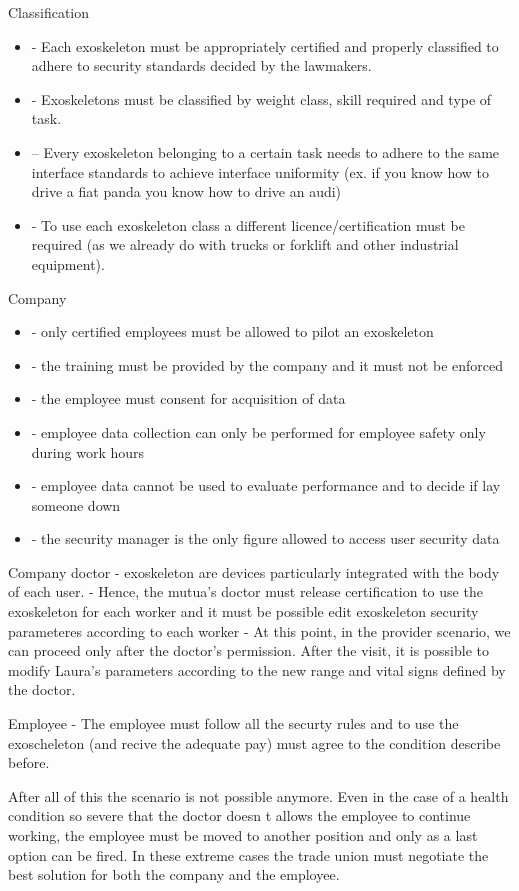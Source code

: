 \documentclass{article}
\begin{document}
Classification
\begin{itemize}
    \item - Each exoskeleton must be appropriately certified and properly classified to adhere to security standards decided by the lawmakers.
    \item - Exoskeletons must be classified by weight class, skill required and type of task.
    \item -- Every exoskeleton belonging to a certain task needs to adhere to the same interface standards to achieve interface uniformity (ex. if you know how to drive a fiat panda you know how to drive an audi)
    \item - To use each exoskeleton class a different licence/certification must be required (as we already do with trucks or forklift and other industrial equipment).
\end{itemize}


Company 
\begin{itemize}
    \item - only certified employees must be allowed to pilot an exoskeleton
    \item - the training must be provided by the company and it must not be enforced
    \item - the employee must consent for acquisition of data
    \item - employee data collection can only be performed for employee safety only during work hours
    \item - employee data cannot be used to evaluate performance and to decide if lay someone down
    \item - the security manager is the only figure allowed to access user security data
\end{itemize}
Company doctor
- exoskeleton are devices particularly integrated with the body of each user. 
- Hence, the mutua's doctor must release certification to use the exoskeleton for each worker and it must be possible edit exoskeleton security parameteres according to each worker
- At this point, in the provider scenario, we can proceed only after the doctor’s permission. After the visit, it is possible to modify Laura’s parameters according to the new range and vital signs defined by the doctor.

Employee
- The employee must follow all the securty rules and to use the exoscheleton (and recive the adequate pay) must agree to the condition describe before.


After all of this the scenario is not possible anymore. Even in the case of a health condition so severe that the doctor doesn t allows the employee to continue working, the employee must be moved to another position and only as a last option can be fired. In these extreme cases the trade union must negotiate the best solution for both the company and the employee.
\end{document}

